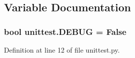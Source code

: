 \subsection{Variable Documentation}
\subsubsection[{\texorpdfstring{D\+E\+B\+UG}{DEBUG}}]{\setlength{\rightskip}{0pt plus 5cm}bool unittest.\+D\+E\+B\+UG = False}\hypertarget{namespaceunittest_a6f95c254ae4668ea73efe6cf7ca3c36d}{}\label{namespaceunittest_a6f95c254ae4668ea73efe6cf7ca3c36d}


Definition at line 12 of file unittest.\+py.


